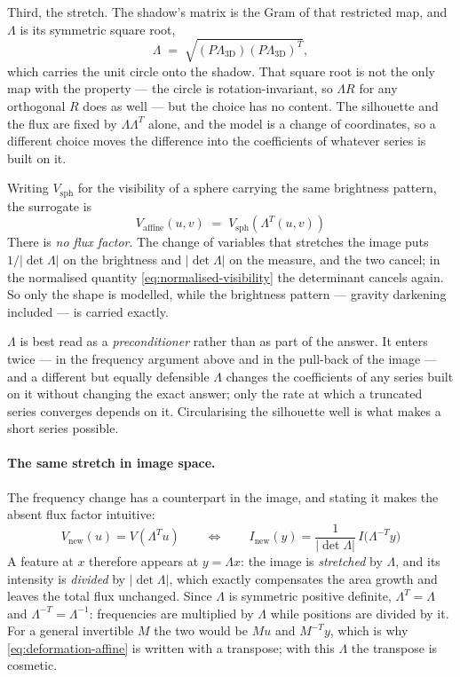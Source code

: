 Third, the stretch.  The shadow's matrix is the Gram of that restricted map, and $\Lambda$ is its
symmetric square root,
\begin{equation}
  \Lambda \;=\; \sqrt{(P\Lambda_{\mathrm{3D}})(P\Lambda_{\mathrm{3D}})^{T}} ,
  \label{eq:deformation-stretch}
\end{equation}
which carries the unit circle onto the shadow.  That square root is not the only map with the
property --- the circle is rotation-invariant, so $\Lambda R$ for any orthogonal $R$ does as well
--- but the choice has no content.  The silhouette and the flux are fixed by
$\Lambda\Lambda^{T}$ alone, and the model is a change of coordinates, so a different choice moves
the difference into the coefficients of whatever series is built on it.

Writing $V_\text{sph}$ for
the visibility of a sphere carrying the same brightness pattern, the surrogate is
\begin{equation}
  V_\text{affine}(u,v) \;=\; V_\text{sph}\!\left(\Lambda^{T}(u,v)\right)
  \label{eq:deformation-affine}
\end{equation}
There is \emph{no flux factor}.  The change of variables that stretches the image puts
$1/|\det\Lambda|$ on the brightness and $|\det\Lambda|$ on the measure, and the two cancel;
in the normalised quantity \eqref{eq:normalised-visibility} the determinant cancels
again.  So only the shape is modelled, while the brightness pattern --- gravity darkening
included --- is carried exactly.

$\Lambda$ is best read as a \emph{preconditioner} rather than as part of the answer.  It enters
twice --- in the frequency argument above and in the pull-back of the image --- and a different
but equally defensible $\Lambda$ changes the coefficients of any series built on it without
changing the exact answer; only the rate at which a truncated series converges depends on it.
Circularising the silhouette well is what makes a short series possible.

\paragraph{The same stretch in image space.}  The frequency change has a counterpart in the
image, and stating it makes the absent flux factor intuitive:
\begin{equation}
  V_\text{new}(u) = V(\Lambda^{T}u)
  \qquad\Longleftrightarrow\qquad
  I_\text{new}(y) = \frac{1}{|\det\Lambda|}\,I\bigl(\Lambda^{-T}y\bigr)
  \label{eq:affine-image-transform}
\end{equation}
A feature at $x$ therefore appears at $y = \Lambda x$: the image is \emph{stretched} by
$\Lambda$, and its intensity is \emph{divided} by $|\det\Lambda|$, which exactly compensates
the area growth and leaves the total flux unchanged.  Since $\Lambda$ is symmetric positive
definite, $\Lambda^{T} = \Lambda$ and $\Lambda^{-T} = \Lambda^{-1}$: frequencies are
multiplied by $\Lambda$ while positions are divided by it.  For a general invertible $M$ the
two would be $Mu$ and $M^{-T}y$, which is why \eqref{eq:deformation-affine} is written with a
transpose; with this $\Lambda$ the transpose is cosmetic.

